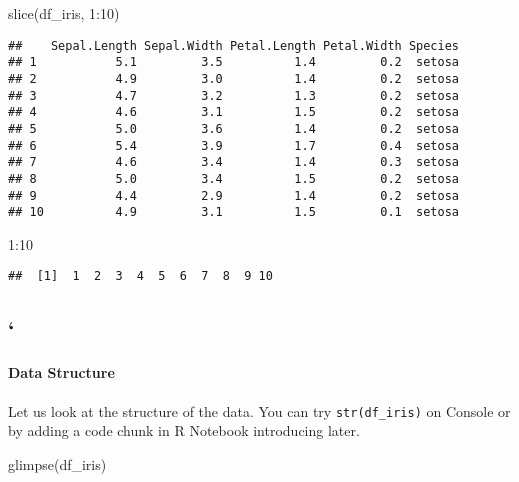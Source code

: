 \documentclass[
]{article}
\newenvironment{Shaded}{\begin{snugshade}}{\end{snugshade}}
\newcommand{\DecValTok}[1]{\textcolor[rgb]{0.00,0.00,0.81}{#1}}
\newcommand{\FunctionTok}[1]{\textcolor[rgb]{0.00,0.00,0.00}{#1}}
\newcommand{\NormalTok}[1]{#1}
\newcommand{\SpecialCharTok}[1]{\textcolor[rgb]{0.00,0.00,0.00}{#1}}
\begin{document}
\begin{Shaded}
\begin{Highlighting}[]
\FunctionTok{slice}\NormalTok{(df\_iris, }\DecValTok{1}\SpecialCharTok{:}\DecValTok{10}\NormalTok{)}
\end{Highlighting}
\end{Shaded}

\begin{verbatim}
##    Sepal.Length Sepal.Width Petal.Length Petal.Width Species
## 1           5.1         3.5          1.4         0.2  setosa
## 2           4.9         3.0          1.4         0.2  setosa
## 3           4.7         3.2          1.3         0.2  setosa
## 4           4.6         3.1          1.5         0.2  setosa
## 5           5.0         3.6          1.4         0.2  setosa
## 6           5.4         3.9          1.7         0.4  setosa
## 7           4.6         3.4          1.4         0.3  setosa
## 8           5.0         3.4          1.5         0.2  setosa
## 9           4.4         2.9          1.4         0.2  setosa
## 10          4.9         3.1          1.5         0.1  setosa
\end{verbatim}

\begin{Shaded}
\begin{Highlighting}[]
\DecValTok{1}\SpecialCharTok{:}\DecValTok{10}
\end{Highlighting}
\end{Shaded}

\begin{verbatim}
##  [1]  1  2  3  4  5  6  7  8  9 10
\end{verbatim}

\hypertarget{section}{%
\subsection{`}\label{section}}

\hypertarget{data-structure}{%
\paragraph{Data Structure}\label{data-structure}}

Let us look at the structure of the data. You can try
\texttt{str(df\_iris)} on Console or by adding a code chunk in R
Notebook introducing later.

\begin{Shaded}
\begin{Highlighting}[]
\FunctionTok{glimpse}\NormalTok{(df\_iris)}
\end{Highlighting}
\end{Shaded}
\end{document}
